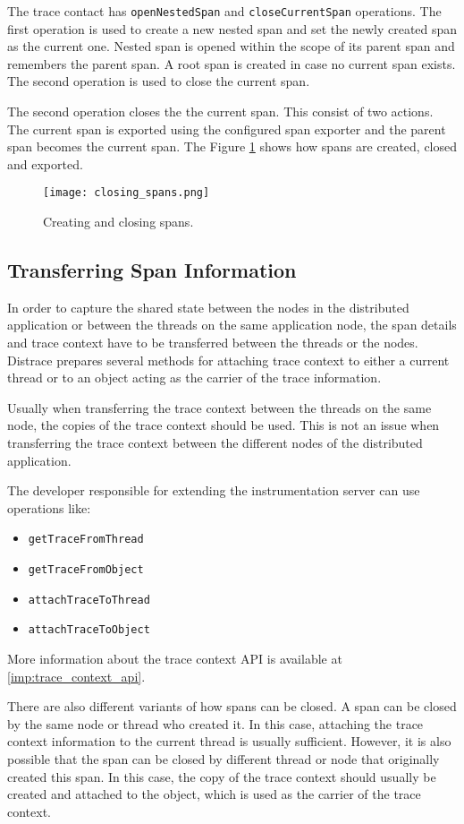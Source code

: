 The trace contact has \texttt{openNestedSpan} and \texttt{closeCurrentSpan} operations. The first operation is used to create a new nested span and set the newly created span as the current one. Nested span is opened within the scope of its parent span and remembers the parent span. A root span is created in case no current span exists. The second operation is used to close the current span.

The second operation closes the the current span. This consist of two actions. The current span is exported using the configured span exporter and the parent span becomes the current span. The Figure \ref{fig:closing_spans} shows how spans are created, closed and exported. \begin{figure}
	\centering
	\texttt{[image: closing\_spans.png]}
	\caption{Creating and closing spans.}
	\label{fig:closing_spans}
\end{figure}

\subsection{Transferring Span Information}
In order to capture the shared state between the nodes in the distributed application or between the threads on the same application node, the span details and trace context have to be transferred between the threads or the nodes. Distrace prepares several methods for attaching trace context to either a current thread or to an object acting as the carrier of the trace information.

Usually when transferring the trace context between the threads on the same node, the copies of the trace context should be used. This is not an issue when transferring the trace context between the different nodes of the distributed application.


The developer responsible for extending the instrumentation server can use operations like:
\begin{itemize}
	\item  \texttt{getTraceFromThread}
	\item \texttt{getTraceFromObject}
	\item \texttt{attachTraceToThread}
	\item \texttt{attachTraceToObject}
\end{itemize}
More information about the trace context API is available at \ref{imp:trace_context_api}.

There are also different variants of how spans can be closed. A span can be closed by the same node or thread who created it. In this case, attaching the trace context information to the current thread is usually sufficient. However, it is also possible that the span can be closed by different thread or node that originally created this span. In this case, the copy of the trace context should usually be created and attached to the object, which is used as the carrier of the trace context.
